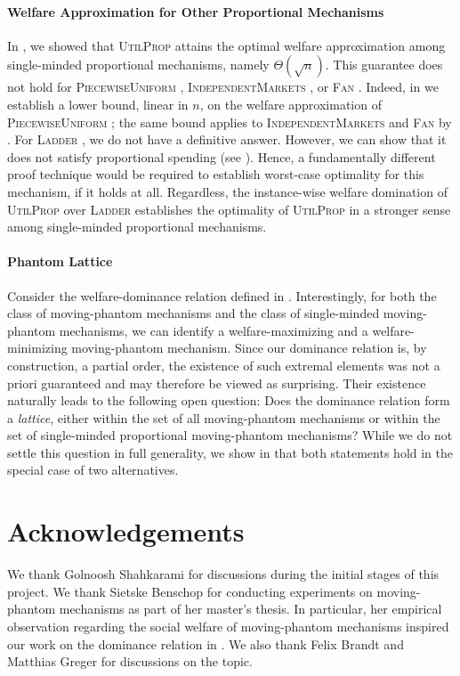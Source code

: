 \documentclass[11pt]{article}
\newcommand{\IM}{\textsc{IndependentMarkets} }
\newcommand{\Ladder}{\textsc{Ladder} }
\newcommand{\Fan}{\textsc{Fan} }
\newcommand{\PiecewiseUniform}{\textsc{PiecewiseUniform} }
\newcommand{\UtP}{\textsc{UtilProp} }
\begin{document}
\paragraph{Welfare Approximation for Other Proportional Mechanisms} 
In , we showed that \UtP attains the optimal welfare approximation among single-minded proportional mechanisms, namely $\Theta(\sqrt{n})$.
This guarantee does not hold for \PiecewiseUniform, \IM, or \Fan.
Indeed, in  we establish a lower bound, linear in $n$, on the welfare approximation of \PiecewiseUniform; the same bound applies to \IM and \Fan by .
For \Ladder, we do not have a definitive answer. However, we can show that it does not satisfy proportional spending (see ).
Hence, a fundamentally different proof technique would be required to establish worst-case optimality for this mechanism, if it holds at all.
Regardless, the instance-wise welfare domination of \UtP over \Ladder establishes the optimality of \UtP in a stronger sense among single-minded proportional mechanisms.

\paragraph{Phantom Lattice} 
Consider the welfare-dominance relation defined in . Interestingly, for both the class of moving-phantom mechanisms and the class of single-minded moving-phantom mechanisms, we can identify a welfare-maximizing and a welfare-minimizing moving-phantom mechanism. Since our dominance relation is, by construction, a partial order, the existence of such extremal elements was not a priori guaranteed and may therefore be viewed as surprising. Their existence naturally leads to the following open question: Does the dominance relation form a \emph{lattice}, either within the set of all moving-phantom mechanisms or within the set of single-minded proportional moving-phantom mechanisms? While we do not settle this question in full generality, we show in  that both statements hold in the special case of two alternatives. 


\section*{Acknowledgements}
We thank Golnoosh Shahkarami for discussions during the initial stages of this project. We thank Sietske Benschop for conducting experiments on moving-phantom mechanisms as part of her master’s thesis. In particular, her empirical observation regarding the social welfare of moving-phantom mechanisms inspired our work on the dominance relation in . We also thank Felix Brandt and Matthias Greger for discussions on the topic.
\end{document}
